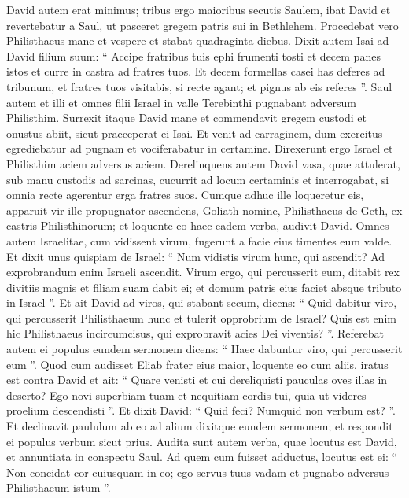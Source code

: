 \begin{biblechapter}
\begin{biblechapter}
\begin{biblechapter}
\begin{biblechapter}
\begin{biblechapter}
\begin{biblechapter}
\begin{biblechapter}
\begin{biblechapter}
\begin{biblechapter}
\begin{biblechapter}
\begin{biblechapter}
\begin{biblechapter}
\begin{biblechapter}
\begin{biblechapter}
\begin{biblechapter}
\begin{biblechapter}
\begin{biblechapter}
 \verse David autem erat minimus; tribus ergo maioribus secutis Saulem, 
\verse ibat David et revertebatur a Saul, ut pasceret gregem patris sui in Bethlehem.
 \verse Procedebat vero Philisthaeus mane et vespere et stabat quadraginta diebus.
 \verse Dixit autem Isai ad David filium suum: “ Accipe fratribus tuis ephi frumenti tosti et decem panes istos et curre in castra ad fratres tuos. 
\verse Et decem formellas casei has deferes ad tribunum, et fratres tuos visitabis, si recte agant; et pignus ab eis referes ”. 
\verse Saul autem et illi et omnes filii Israel in valle Terebinthi pugnabant adversum Philisthim.
 \verse Surrexit itaque David mane et commendavit gregem custodi et onustus abiit, sicut praeceperat ei Isai. Et venit ad carraginem, dum exercitus egrediebatur ad pugnam et vociferabatur in certamine. 
\verse Direxerunt ergo Israel et Philisthim aciem adversus aciem. 
\verse Derelinquens autem David vasa, quae attulerat, sub manu custodis ad sarcinas, cucurrit ad locum certaminis et interrogabat, si omnia recte agerentur erga fratres suos.
 \verse Cumque adhuc ille loqueretur eis, apparuit vir ille propugnator ascendens, Goliath nomine, Philisthaeus de Geth, ex castris Philisthinorum; et loquente eo haec eadem verba, audivit David. 
\verse Omnes autem Israelitae, cum vidissent virum, fugerunt a facie eius timentes eum valde. 
\verse Et dixit unus quispiam de Israel: “ Num vidistis virum hunc, qui ascendit? Ad exprobrandum enim Israeli ascendit. Virum ergo, qui percusserit eum, ditabit rex divitiis magnis et filiam suam dabit ei; et domum patris eius faciet absque tributo in Israel ”.
 \verse Et ait David ad viros, qui stabant secum, dicens: “ Quid dabitur viro, qui percusserit Philisthaeum hunc et tulerit opprobrium de Israel? Quis est enim hic Philisthaeus incircumcisus, qui exprobravit acies Dei viventis? ”. 
\verse Referebat autem ei populus eundem sermonem dicens: “ Haec dabuntur viro, qui percusserit eum ”. 
\verse Quod cum audisset Eliab frater eius maior, loquente eo cum aliis, iratus est contra David et ait: “ Quare venisti et cui dereliquisti pauculas oves illas in deserto? Ego novi superbiam tuam et nequitiam cordis tui, quia ut videres proelium descendisti ”. 
\verse Et dixit David: “ Quid feci? Numquid non verbum est? ”. 
\verse Et declinavit paululum ab eo ad alium dixitque eundem sermonem; et respondit ei populus verbum sicut prius.
 \verse Audita sunt autem verba, quae locutus est David, et annuntiata in conspectu Saul. 
\verse Ad quem cum fuisset adductus, locutus est ei: “ Non concidat cor cuiusquam in eo; ego servus tuus vadam et pugnabo adversus Philisthaeum istum ”. 

\end{biblechapter}
\end{biblechapter}
\end{biblechapter}
\end{biblechapter}
\end{biblechapter}
\end{biblechapter}
\end{biblechapter}
\end{biblechapter}
\end{biblechapter}
\end{biblechapter}
\end{biblechapter}
\end{biblechapter}
\end{biblechapter}
\end{biblechapter}
\end{biblechapter}
\end{biblechapter}
\end{biblechapter}
